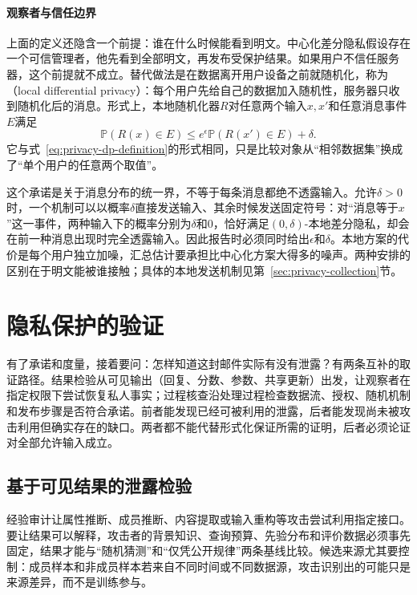 \paragraph{观察者与信任边界}

上面的定义还隐含一个前提：谁在什么时候能看到明文。中心化差分隐私假设存在一个可信管理者，他先看到全部明文，再发布受保护结果。如果用户不信任服务器，这个前提就不成立。替代做法是在数据离开用户设备之前就随机化，称为（local differential privacy）：每个用户先给自己的数据加入随机性，服务器只收到随机化后的消息。形式上，本地随机化器$R$对任意两个输入$x,x'$和任意消息事件$E$满足
\[
 \mathbb P(R(x)\in E)
 \leq e^\epsilon\mathbb P(R(x')\in E)+\delta.
\]
它与式~\eqref{eq:privacy-dp-definition}的形式相同，只是比较对象从“相邻数据集”换成了“单个用户的任意两个取值”。

这个承诺是关于消息分布的统一界，不等于每条消息都绝不透露输入。允许$\delta>0$时，一个机制可以以概率$\delta$直接发送输入、其余时候发送固定符号：对“消息等于$x$”这一事件，两种输入下的概率分别为$\delta$和0，恰好满足$(0,\delta)$-本地差分隐私，却会在前一种消息出现时完全透露输入。因此报告时必须同时给出$\epsilon$和$\delta$。本地方案的代价是每个用户独立加噪，汇总估计要承担比中心化方案大得多的噪声。两种安排的区别在于明文能被谁接触；具体的本地发送机制见第~\ref{sec:privacy-collection}节。

\section{隐私保护的验证}
\label{sec:privacy-verification}

有了承诺和度量，接着要问：怎样知道这封邮件实际有没有泄露？有两条互补的取证路径。结果检验从可见输出（回复、分数、参数、共享更新）出发，让观察者在指定权限下尝试恢复私人事实；过程核查沿处理过程检查数据流、授权、随机机制和发布步骤是否符合承诺。前者能发现已经可被利用的泄露，后者能发现尚未被攻击利用但确实存在的缺口。两者都不能代替形式化保证所需的证明，后者必须论证对全部允许输入成立。

\subsection{基于可见结果的泄露检验}
\label{sec:privacy-leakage-audit}

经验审计让属性推断、成员推断、内容提取或输入重构等攻击尝试利用指定接口。要让结果可以解释，攻击者的背景知识、查询预算、先验分布和评价数据必须事先固定，结果才能与“随机猜测”和“仅凭公开规律”两条基线比较。候选来源尤其要控制：成员样本和非成员样本若来自不同时间或不同数据源，攻击识别出的可能只是来源差异，而不是训练参与。

